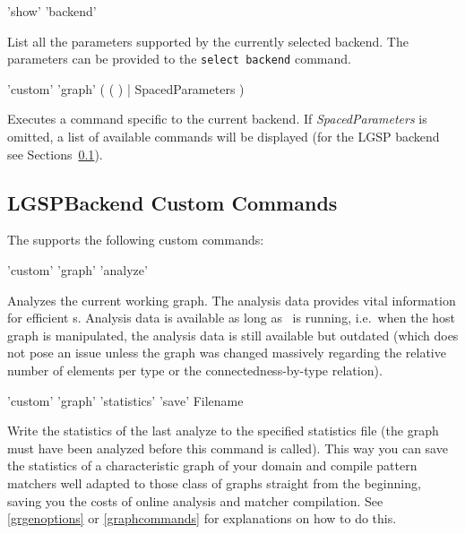 \begin{rail}
  'show' 'backend'
\end{rail}\nopagebreak{}
List all the parameters supported by the currently selected backend.
The parameters can be provided to the \texttt{select backend} command.

\begin{rail}
  'custom' 'graph' ( ( ) | SpacedParameters )
\end{rail}
Executes a command specific to the current backend.
If \emph{SpacedParameters} is omitted, a list of available commands will be displayed (for the LGSP backend see Sections~\ref{custom}).


\subsection{LGSPBackend Custom Commands}
\label{custom}


The  supports the following custom commands:

\begin{rail}
  'custom' 'graph' 'analyze'
\end{rail}
Analyzes the current working graph.
The analysis data provides vital information for efficient s.
Analysis data is available as long as \GrShell\ is running, i.e.\ when the host graph is manipulated, the analysis data is still available but outdated (which does not pose an issue unless the graph was changed massively regarding the relative number of elements per type or the connectedness-by-type relation).

\begin{rail}
  'custom' 'graph' 'statistics' 'save' Filename
\end{rail}
Write the statistics of the last analyze to the specified statistics file (the graph must have been analyzed before this command is called).
This way you can save the statistics of a characteristic graph of your domain and compile pattern matchers well adapted to those class of graphs straight from the beginning, saving you the costs of online analysis and matcher compilation.
See \ref{grgenoptions} or \ref{graphcommands} for explanations on how to do this.

